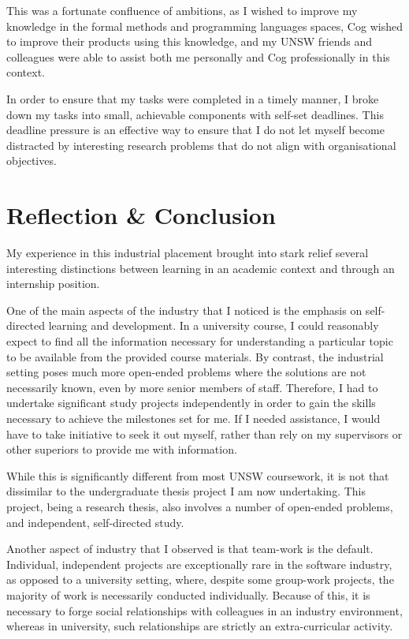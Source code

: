 \documentclass{report}
\begin{document}
This was a fortunate confluence of ambitions, as I wished to improve my knowledge in the 
formal methods and programming languages spaces, Cog wished to improve their products using 
this knowledge, and my UNSW friends and colleagues were able to assist both me personally and Cog 
professionally in this context.

In order to ensure that my tasks were completed in a timely manner, I broke down my tasks 
into small, achievable components with self-set deadlines. This deadline pressure is an effective way
to ensure that I do not let myself become distracted by interesting research problems that do not 
align with organisational objectives.

\chapter{Reflection \& Conclusion}
\label{ch:reflection}

My experience in this industrial placement brought into stark relief several interesting distinctions
between learning in an academic context and through an internship position. 

One of the main aspects of the industry that I noticed is the emphasis on self-directed learning 
and development. In a university course, I could reasonably expect to find all the information 
necessary for understanding a particular topic to be available from the provided course materials. 
By contrast, the industrial setting poses much more open-ended problems where the solutions 
are not necessarily known, even by more senior members of staff. Therefore, I had to undertake 
significant study projects independently in order to gain the skills necessary to achieve the 
milestones set for me. If I needed assistance, I would have to take initiative to seek it out myself, 
rather than rely on my supervisors or other superiors to provide me with information.

While this is significantly different from most UNSW coursework, it is not that dissimilar to 
the undergraduate thesis project I am now undertaking. This project, being a research thesis, 
also involves a number of open-ended problems, and independent, self-directed study. 

Another aspect of industry that I observed is that team-work is the default. Individual, independent
projects are exceptionally rare in the software industry, as opposed to a university setting, where,
despite some group-work projects, the majority of work is necessarily conducted individually.
Because of this, it is necessary to forge social relationships with colleagues in an industry environment,
whereas in university, such relationships are strictly an extra-curricular activity.
\end{document}
